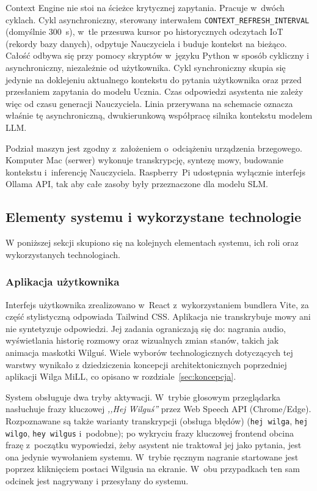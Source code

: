 Context Engine nie stoi na ścieżce krytycznej zapytania. Pracuje w~dwóch
cyklach. Cykl asynchroniczny, sterowany interwałem
\texttt{CONTEXT\_REFRESH\_INTERVAL} (domyślnie 300~s), w~tle przesuwa
kursor po historycznych odczytach IoT (rekordy bazy danych), odpytuje Nauczyciela i buduje kontekst na bieżąco. Całość odbywa się przy pomocy skryptów w~języku Python w sposób cykliczny i asynchroniczny, niezależnie od użytkownika. Cykl synchroniczny skupia się jedynie na doklejeniu aktualnego kontekstu do pytania użytkownika oraz przed przesłaniem zapytania do modelu Ucznia. Czas odpowiedzi asystenta nie zależy więc od czasu generacji
Nauczyciela. Linia przerywana na schemacie oznacza właśnie tę asynchroniczną,
dwukierunkową współpracę silnika kontekstu modelem LLM.

Podział maszyn jest zgodny z~założeniem o~odciążeniu urządzenia brzegowego.
Komputer Mac (serwer) wykonuje transkrypcję, syntezę mowy, budowanie
kontekstu i~inferencję Nauczyciela. Raspberry~Pi udostępnia wyłącznie
interfejs Ollama API, tak aby całe zasoby były przeznaczone dla modelu SLM.

\subsection{Elementy systemu i wykorzystane technologie}
\label{subsec:elementy}

W poniższej sekcji skupiono się na kolejnych elementach systemu, ich roli oraz wykorzystanych technologiach.

\subsubsection{Aplikacja użytkownika}

Interfejs użytkownika zrealizowano w~React z~wykorzystaniem bundlera Vite, za część stylistyczną odpowiada Tailwind CSS.
Aplikacja nie transkrybuje mowy ani nie syntetyzuje odpowiedzi. Jej zadania ograniczają się do:
nagrania audio, wyświetlania historię rozmowy oraz wizualnych zmian stanów, takich jak animacja maskotki Wilguś. Wiele wyborów technologicznych dotyczących tej warstwy wynikało z dziedziczenia koncepcji architektonicznych poprzedniej aplikacji Wilga MiLL, co 
opisano w rozdziale~\ref{sec:koncepcja}.

System obsługuje dwa tryby aktywacji. W~trybie głosowym przeglądarka
nasłuchuje frazy kluczowej \textit{,,Hej Wilguś''} przez Web Speech API
(Chrome/Edge). Rozpoznawane są także warianty transkrypcji (obsługa błędów)
(\texttt{hej wilga}, \texttt{hej wilgo}, \texttt{hey wilgus} i~podobne);
po wykryciu frazy kluczowej frontend obcina frazę z~początku wypowiedzi, żeby asystent
nie traktował jej jako pytania, jest ona jedynie wywołaniem systemu. W~trybie ręcznym nagranie startowane jest poprzez
kliknięciem postaci Wilgusia na ekranie. W~obu przypadkach ten sam odcinek jest nagrywany i przesyłany do systemu.

